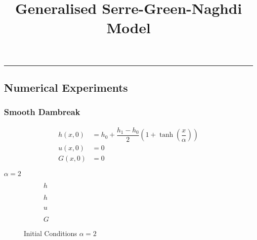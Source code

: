 \documentclass[10pt]{article}
\title{Generalised Serre-Green-Naghdi Model}
\begin{document}
\maketitle

\vspace{-0.3in}
\noindent
\rule{\linewidth}{0.4pt}




\subsection{Numerical Experiments}

\subsubsection{Smooth Dambreak}

\begin{align}
h(x,0) & = h_0 + \dfrac{h_1 - h_0}{2} \left(1 + \tanh\left(\dfrac{x}{\alpha}\right)\right)  \\
u(x,0) &= 0 \\
G(x,0) &= 0
\end{align}

$\alpha = 2$

\begin{figure}
	\centering
	\begin{subfigure}{0.49\textwidth}
		\centering
		
		\caption{$h$}
	\end{subfigure}
	\begin{subfigure}{0.49\textwidth}
		\centering
		
		\caption{$h$}
	\end{subfigure}
	\begin{subfigure}{0.49\textwidth}
		\centering
		
		\caption{$u$}
	\end{subfigure}
	\begin{subfigure}{0.49\textwidth}
		\centering
		
		\caption{$G$}
	\end{subfigure}
	\caption{Initial Conditions $\alpha = 2$}
\end{figure}
\end{document}
